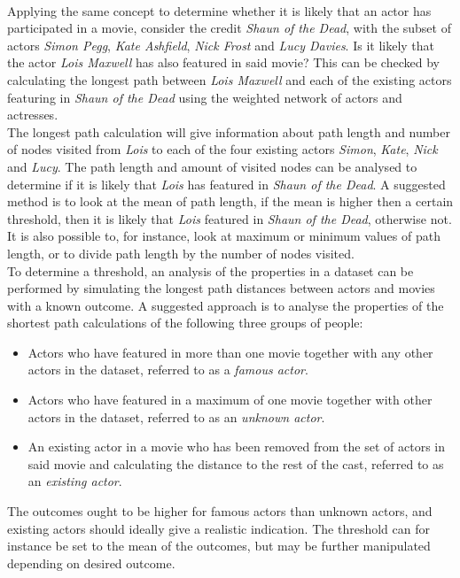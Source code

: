 \documentclass[12pt]{ieeeconf}      %
\begin{document}
\\
\indent Applying the same concept to determine whether it is likely that an actor has participated in a movie, consider the credit \textit{Shaun of the Dead}, with the subset of actors \textit{Simon Pegg}, \textit{Kate Ashfield}, \textit{Nick Frost} and \textit{Lucy Davies}. Is it likely that the actor \textit{Lois Maxwell} has also featured in said movie? This can be checked by calculating the longest path between \textit{Lois Maxwell} and each of the existing actors featuring in \textit{Shaun of the Dead} using the weighted network of actors and actresses. 
\\
\indent The longest path calculation will give information about path length and number of nodes visited from \textit{Lois} to each of the four existing actors \textit{Simon}, \textit{Kate}, \textit{Nick} and \textit{Lucy}. The path length and amount of visited nodes can be analysed to determine if it is likely that \textit{Lois} has featured in \textit{Shaun of the Dead}. A suggested method is to look at the mean of path length, if the mean is higher then a certain threshold, then it is likely that \textit{Lois} featured in \textit{Shaun of the Dead}, otherwise not. It is also possible to, for instance, look at maximum or minimum values of path length, or to divide path length by the number of nodes visited. 
\\
\indent To determine a threshold, an analysis of the properties in a dataset can be performed by simulating the longest path distances between actors and movies with a known outcome. A suggested approach is to analyse the properties of the shortest path calculations of the following three groups of people:

\begin{itemize}
\item Actors who have featured in more than one movie together with any other actors in the dataset, referred to as a \textit{famous actor}.
\item Actors who have featured in a maximum of one movie together with other actors in the dataset, referred to as an \textit{unknown actor}.
\item An existing actor in a movie who has been removed from the set of actors in said movie and calculating the distance to the rest of the cast, referred to as an \textit{existing actor}.
\end{itemize} 

\indent The outcomes ought to be higher for famous actors than unknown actors, and existing actors should ideally give a realistic indication. The threshold can for instance be set to the mean of the outcomes, but may be further manipulated depending on desired outcome.
\end{document}

